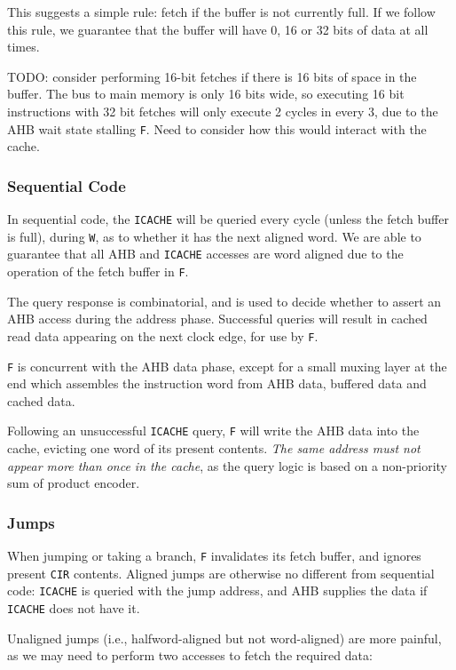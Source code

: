 \documentclass{article}
\begin{document}
This suggests a simple rule: fetch if the buffer is not currently full. If we follow this rule, we guarantee that the buffer will have 0, 16 or 32 bits of data at all times.

TODO: consider performing 16-bit fetches if there is 16 bits of space in the buffer. The bus to main memory is only 16 bits wide, so executing 16 bit instructions with 32 bit fetches will only execute 2 cycles in every 3, due to the AHB wait state stalling \texttt{F}. Need to consider how this would interact with the cache.

\subsubsection{Sequential Code}

In sequential code, the \texttt{ICACHE} will be queried every cycle (unless the fetch buffer is full), during \texttt{W}, as to whether it has the next aligned word. We are able to guarantee that all AHB and \texttt{ICACHE} accesses are word aligned due to the operation of the fetch buffer in \texttt{F}.

The query response is combinatorial, and is used to decide whether to assert an AHB access during the address phase. Successful queries will result in cached read data appearing on the next clock edge, for use by \texttt{F}.

\texttt{F} is concurrent with the AHB data phase, except for a small muxing layer at the end which assembles the instruction word from AHB data, buffered data and cached data.

Following an unsuccessful \texttt{ICACHE} query, \texttt{F} will write the AHB data into the cache, evicting one word of its present contents. \textit{The same address must not appear more than once in the cache}, as the query logic is based on a non-priority sum of product encoder.


\subsubsection{Jumps}
\label{section:jumps}

When jumping or taking a branch, \texttt{F} invalidates its fetch buffer, and ignores present \texttt{CIR} contents. Aligned jumps are otherwise no different from sequential code: \texttt{ICACHE} is queried with the jump address, and AHB supplies the data if \texttt{ICACHE} does not have it.

Unaligned jumps (i.e., halfword-aligned but not word-aligned) are more painful, as we may need to perform two accesses to fetch the required data:
\end{document}
